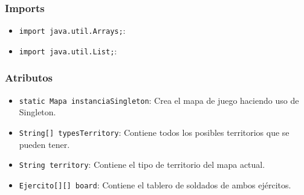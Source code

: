 \documentclass{article}
\begin{document}
\subsubsection{Imports}
\begin{itemize}
    \item \texttt{import java.util.Arrays;}: 
    \item \texttt{import java.util.List;}: 
\end{itemize}


\subsubsection{Atributos}
\begin{itemize}
    \item \texttt{static Mapa instanciaSingleton}: Crea el mapa de juego haciendo uso de Singleton.
    \item \texttt{String[] typesTerritory}: Contiene todos los posibles territorios que se pueden tener.
    \item \texttt{String territory}: Contiene el tipo de territorio del mapa actual.
    \item \texttt{Ejercito[][] board}: Contiene el tablero de soldados de ambos ejércitos.
\end{itemize}

\end{document}
